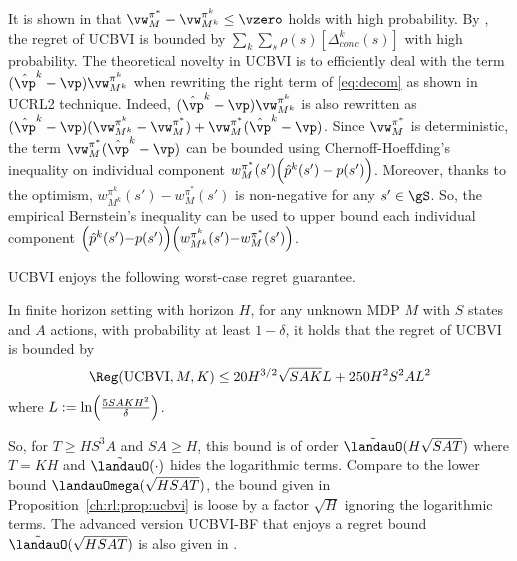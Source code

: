 It is shown in \cite{azar2017minimax} that $\vw^{\pi^*}_M- \vw^{\pi^k}_{M^k}\le \vzero$ holds with high probability.
By , the regret of UCBVI is bounded by ${\sum_{k}\sum_{s}\rho(s)[\Delta_{conc}^k(s)]}$ with high probability.
The theoretical novelty in UCBVI is to efficiently deal with the term $(\hat{\vp}^k-\vp)\vw^{\pi^k}_{M^k}$ when rewriting the right term of \eqref{eq:decom} as shown in UCRL2 technique.
Indeed, $(\hat{\vp}^k-\vp)\vw^{\pi^k}_{M^k}$ is also rewritten as $(\hat{\vp}^k-\vp)(\vw^{\pi^k}_{M^k}-\vw^{\pi^*}_{M}) +\vw^{\pi^*}_{M}(\hat{\vp}^k-\vp)$.
Since $\vw^{\pi^*}_M$ is deterministic, the term $\vw^{\pi^*}_{M}(\hat{\vp}^k-\vp)$ can be bounded using Chernoff-Hoeffding's inequality on individual component $w^{\pi^*}_{M}(s')\Bigl(\hat{p}^k(s')-p(s')\Bigr)$.
Moreover, thanks to the optimism, $w^{\pi^k}_{M^k}(s')-w^{\pi^*}_{M}(s')$ is non-negative for any $s'\in\gS$.
So, the empirical Bernstein's inequality can be used to upper bound each individual component $\Bigl(\hat{p}^k(s'){-}p(s')\Bigr)\Bigl(w^{\pi^k}_{M^k}(s'){-}w^{\pi^*}_{M}(s')\Bigr)$.

UCBVI enjoys the following worst-case regret guarantee.
\begin{prop}
    \label{ch:rl:prop:ucbvi}
    In finite horizon setting with horizon $H$, for any unknown MDP $M$ with $S$ states and $A$ actions,
    with probability at least $1-\delta$, it holds that the regret of UCBVI is bounded by
    \begin{align*}
        \Reg(\textnormal{UCBVI}, M, K) \le 20H^{3/2}\sqrt{SAK}L +250H^2S^2AL^2
    \end{align*}
    where $L:=\ln\Bigl(\frac{5SAKH^2}{\delta}\Bigr)$.
\end{prop}
So, for $T\ge HS^3A$ and $SA\ge H$, this bound is of order $\tilde{\landauO}(H\sqrt{SAT})$ where $T=KH$ and $\tilde{\landauO}(\cdot)$ hides the logarithmic terms.
Compare to the lower bound $\landauOmega(\sqrt{HSAT})$, the bound given in Proposition~\ref{ch:rl:prop:ucbvi} is loose by a factor $\sqrt{H}$ ignoring the logarithmic terms.
The advanced version UCBVI-BF that enjoys a regret bound $\tilde{\landauO}(\sqrt{HSAT})$ is also given in \cite{azar2017minimax}.%

